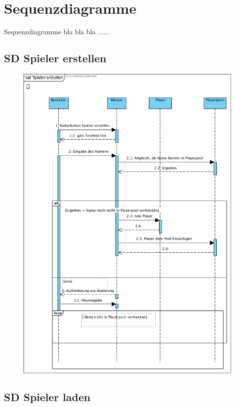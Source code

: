 \clearpage

\chapter{Sequenzdiagramme}
Sequenzdiagramme bla bla bla ......


\clearpage
\section{SD Spieler erstellen}

\begin{figure}[!h]
	\centering
    \includegraphics[width=\textwidth]{./SD_Spieler_erstellen.png}
	\label{layout_gesamt}
\end{figure}


\clearpage
\section{SD Spieler laden}

